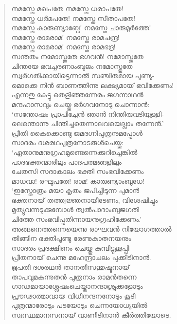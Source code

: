 \begin{verse}
നമസ്തേ മഖപതേ നമസ്തേ ധരാപതേ!\\
നമസ്തേ ധര്‍മപതേ! നമസ്തേ സീതാപതേ!\\
നമസ്തേ കാരുണ്യാബ്ധേ! നമസ്തേ ചാരുമൂര്‍ത്തേ!\\
നമസ്തേ രാമരാമ! നമസ്തേ രാമചന്ദ്ര!\\
നമസ്തേ രാമരാമ! നമസ്തേ രാമഭദ്ര!\\
സന്തതം നമോസ്തുതേ ഭഗവന്‍! നമോസ്തുതേ\\
ചിന്തയേ ഭവച്ചരണാംബുജം നമോസ്തുതേ\\
സ്വര്‍ഗതിക്കായിട്ടെന്നാല്‍ സഞ്ചിതമായ പുണ്യ-\\
മൊക്കെ നിന്‍ ബാണത്തിന്നു ലക്ഷ്യമായ് \hbox{ഭവിക്കേണം!}\\
എന്നതു കേട്ടു തെളിഞ്ഞന്നേരം ജഗന്നാഥന്‍\\
മന്ദഹാസവും ചെയ്തു ഭര്‍ഗവനോടു ചൊന്നാന്‍:\\
‘സന്തോഷം പ്രാപിച്ചേന്‍ ഞാന്‍ നിന്തിരുവടിയുള്ളി-\\
ലെന്തൊന്നു ചിന്തിച്ചതെന്നാലവയെല്ലാം തന്നേന്‍.’\\
പ്രീതി കൈക്കൊണ്ടു ജമദഗ്നിപുത്രനുമപ്പോള്‍\\
സാദരം ദശരഥപുത്രനോടരുള്‍ചെയ്തു:\\
‘ഏതാനുമനുഗ്രഹമുണ്ടെന്നെക്കുറിച്ചെങ്കില്‍\\
പാദഭക്തന്മാരിലും പാദപത്മങ്ങളിലും\\
ചേതസി സദാകാലം ഭക്തി സംഭവിക്കേണം\\
മാധവാ! രഘുപതേ! രാമ! കാരുണ്യാംബുധേ!\\
‘ഇസ്തോത്രം മയാ കൃതം ജപിച്ചീടുന്ന പുമാന്‍\\
ഭക്തനായ് തത്ത്വജ്ഞനായീടേണം, വിശേഷിച്ചും\\
മൃത്യുവന്നടുക്കുമ്പോള്‍ ത്വല്‍പാദാംബുജഗതി\\
ചിത്തേ സംഭവിപ്പതിന്നായനുഗ്രഹിക്കേണം.’\\
അങ്ങനെത്തന്നെയെന്നു രാഘവന്‍ നിയോഗത്താല്‍\\
തിങ്ങിന ഭക്തിപൂണ്ടു രേണുകാതനയനും\\
സാദരം പ്രദക്ഷിണം ചെയ്തു കുമ്പിട്ടുക്കൂപ്പി\\
പ്രീതനായ് ചെന്നു മഹേന്ദ്രാചലം പുക്കീടിനാന്‍.\\
ഭൂപതി ദശരഥന്‍ താനതിസന്തുഷ്ടനായ്\\
താപവുമകന്നുതന്‍ പുത്രനാം രാമന്‍തന്നെ\\
ഗാഢമായാശ്ലേഷംചെയ്താനന്ദാശ്രുക്കളോടും\\
പ്രൗഢാത്മാവായ വിധിനന്ദനനോടും കൂടി\\
പുത്രന്മാരോടും പടയോടും ചെന്നയോധ്യയില്‍\\
സ്വസ്ഥമാനസനായ് വാണീടിനാന്‍ കീര്‍ത്തിയോടെ.\\

\end{verse}
